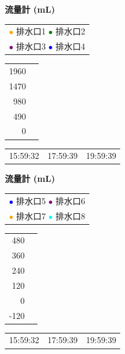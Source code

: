 \documentclass[UTF8,10pt,a4paper,fontset=fandol]{ctexart}
\begin{document}
\begin{center}
\small
\begin{minipage}[t]{0.47\linewidth}
\centering
\textbf{流量計 (mL)}

\begin{tabular}{c}
\textcolor{orange}{\(\bullet\)} 排水口1 \quad
\textcolor{green}{\(\bullet\)} 排水口2\\
\textcolor{purple}{\(\bullet\)} 排水口3 \quad
\textcolor{blue}{\(\bullet\)} 排水口4
\end{tabular}

\vspace{0.5em}

\begin{tabular}{r|l}
1960 & \rule{0pt}{1.2em}\\
1470 & \rule{0pt}{1.2em}\\
980  & \rule{0pt}{1.2em}\\
490  & \rule{0pt}{1.2em}\\
0    & \rule{0pt}{1.2em}
\end{tabular}

\vspace{0.5em}

\begin{tabular}{ccc}
15:59:32 & 17:59:39 & 19:59:39
\end{tabular}

\end{minipage}
\hfill
\begin{minipage}[t]{0.47\linewidth}
\centering
\textbf{流量計 (mL)}

\begin{tabular}{c}
\textcolor{blue}{\(\bullet\)} 排水口5 \quad
\textcolor{purple}{\(\bullet\)} 排水口6\\
\textcolor{orange}{\(\bullet\)} 排水口7 \quad
\textcolor{cyan}{\(\bullet\)} 排水口8
\end{tabular}

\vspace{0.5em}

\begin{tabular}{r|l}
480  & \rule{0pt}{1.2em}\\
360  & \rule{0pt}{1.2em}\\
240  & \rule{0pt}{1.2em}\\
120  & \rule{0pt}{1.2em}\\
0    & \rule{0pt}{1.2em}\\
-120 & \rule{0pt}{1.2em}
\end{tabular}

\vspace{0.5em}

\begin{tabular}{ccc}
15:59:32 & 17:59:39 & 19:59:39
\end{tabular}

\end{minipage}
\end{center}
\end{document}
